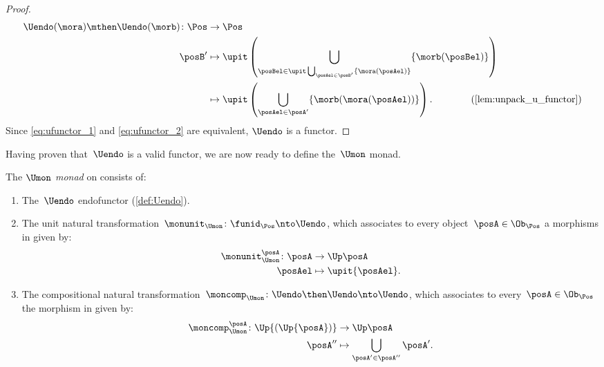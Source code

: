 \begin{proof}
\begin{equation}
\begin{aligned}
			\Uendo(\mora)\mthen \Uendo(\morb)\colon \Pos & \to \Pos                                                                                                              \\
			\posB'                                       & \mapsto \upit\left( \bigcup_{\posBel\in \upit \bigcup_{\posAel\in \posB'}\{\mora(\posAel)\}}\{\morb(\posBel)\}\right) \\
			                                             & \mapsto \upit \left(\bigcup_{\posAel\in \posA'} \{ \morb(\mora(\posAel))\}\right).
			\qquad \qquad (\cref{lem:unpack_u_functor})
		\end{aligned}
	\end{equation}
	Since \cref{eq:ufunctor_1} and \cref{eq:ufunctor_2} are equivalent, $\Uendo$ is a functor.
\end{proof}
Having proven that~$\Uendo$ is a valid functor, we are now ready to define the~$\Umon$ monad.
\begin{definition}
	\label{def:Umon}
	The \emph{$\Umon$ monad} on \Pos consists of:
	\begin{enumerate}
		\item The~$\Uendo$ endofunctor (\cref{def:Uendo}).
		\item The unit natural transformation~$\monunit_{\Umon} \colon \funid_{\Pos}\nto \Uendo$, which associates to every object~$\posA \in \Ob_\Pos$ a morphisms in \Pos given by:
		      \begin{equation}
			      \begin{aligned}
				      \monunit_{\Umon}^\posA\colon \posA & \to \Up \posA              \\
				      \posAel                            & \mapsto \upit \{\posAel\}.
			      \end{aligned}
		      \end{equation}
		\item The compositional natural transformation~$\moncomp_{\Umon}\colon \Uendo\then \Uendo\nto \Uendo$, which associates to every~$\posA\in \Ob_\Pos$ the morphism in \Pos given by:
		      \begin{equation}
			      \begin{aligned}
				      \moncomp_{\Umon}^\posA\colon \Up{(\Up{\posA})} & \to \Up \posA                              \\
				      \posA''                                        & \mapsto \bigcup_{\posA'\in \posA''}\posA'.
			      \end{aligned}
		      \end{equation}
	\end{enumerate}
\end{definition}

